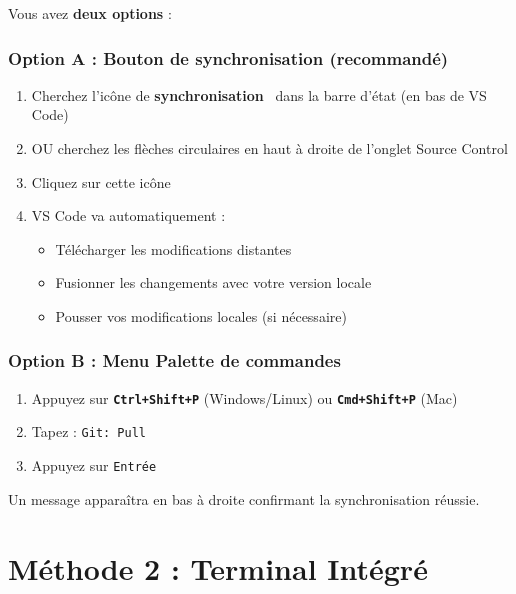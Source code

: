 \documentclass[a4paper,11pt]{article}
\begin{document}
Vous avez \textbf{deux options} :

\subsubsection*{Option A : Bouton de synchronisation (recommandé)}

\begin{enumerate}[leftmargin=2cm]
    \item Cherchez l'icône de \textbf{synchronisation} \faSync\ dans la barre d'état (en bas de VS Code)
    \item OU cherchez les flèches circulaires en haut à droite de l'onglet Source Control
    \item Cliquez sur cette icône
    \item VS Code va automatiquement :
    \begin{itemize}
        \item[\faDownload] Télécharger les modifications distantes
        \item[\faMagic] Fusionner les changements avec votre version locale
        \item[\faUpload] Pousser vos modifications locales (si nécessaire)
    \end{itemize}
\end{enumerate}

\subsubsection*{Option B : Menu Palette de commandes}

\begin{enumerate}[leftmargin=2cm]
    \item Appuyez sur \texttt{\textbf{Ctrl+Shift+P}} (Windows/Linux) ou \texttt{\textbf{Cmd+Shift+P}} (Mac)
    \item Tapez : \texttt{Git: Pull}
    \item Appuyez sur \texttt{Entrée}
\end{enumerate}

\vspace{0.5cm}

\begin{tcolorbox}[colback=gitgreen!10,colframe=gitgreen,title={\faCheckCircle\ Confirmation}]
Un message apparaîtra en bas à droite confirmant la synchronisation réussie.
\end{tcolorbox}

\newpage

\section{Méthode 2 : Terminal Intégré \faTerminal}
\end{document}
